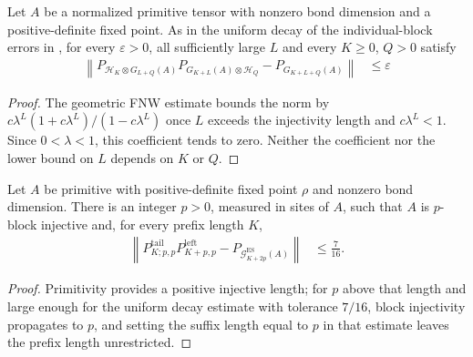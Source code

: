 \begin{lemma}
    \label{thm:primitive_whole_increment_defect_decay}
    \leanok
    Let $A$ be a normalized primitive tensor with nonzero bond dimension and a
    positive-definite fixed point. As in the uniform decay of the
    individual-block errors in \cite[Section~6]{Nachtergaele1996Spectral}, for
    every $\varepsilon>0$, all sufficiently large $L$ and every $K\geq0$,
    $Q>0$ satisfy
    \begin{align}
        \left\lVert P_{\mathcal H_K\otimes G_{L+Q}(A)}
        P_{G_{K+L}(A)\otimes\mathcal H_Q}-P_{G_{K+L+Q}(A)}\right\rVert
         & \leq\varepsilon
    \end{align}
\end{lemma}
\begin{proof}
    \leanok
    The geometric FNW estimate bounds the norm by
    $c\lambda^L(1+c\lambda^L)/(1-c\lambda^L)$ once $L$ exceeds the
    injectivity length and $c\lambda^L<1$. Since $0<\lambda<1$, this coefficient
    tends to zero. Neither the coefficient nor the lower bound on $L$ depends
    on $K$ or $Q$.
\end{proof}

\begin{lemma}
    \label{thm:uniform_whole_increment_defect_seven_sixteenths}
    \leanok
    Let $A$ be primitive with positive-definite fixed point $\rho$ and nonzero
    bond dimension.  There is an integer $p>0$, measured in sites of $A$, such
    that $A$ is $p$-block injective and, for every prefix length $K$,
    \begin{align}
        \left\lVert
        P^{\mathrm{tail}}_{K;p,p}P^{\mathrm{left}}_{K+p,p}
        -P_{\mathcal G_{K+2p}^{\mathrm{ES}}(A)}
        \right\rVert
         & \leq \frac{7}{16}.
    \end{align}
\end{lemma}

\begin{proof}
    \leanok
    Primitivity provides a positive injective length; for $p$ above that
    length and large enough for the uniform decay estimate with tolerance
    $7/16$, block injectivity propagates to $p$, and setting the suffix length
    equal to $p$ in that estimate leaves the prefix length unrestricted.
\end{proof}

